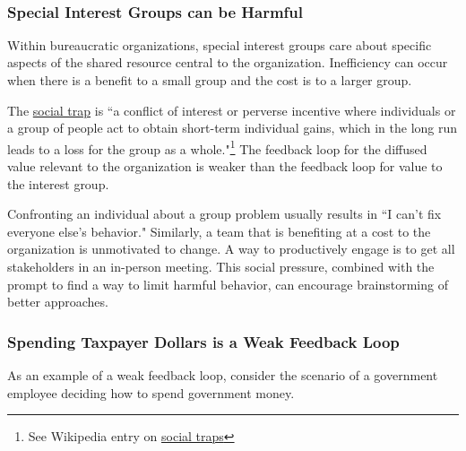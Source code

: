 
\ \\



\subsubsection*{Special Interest Groups can be Harmful}

Within bureaucratic organizations, special interest groups care about specific aspects of the shared resource central to the organization. 
Inefficiency can occur when there is a benefit to a small group and the cost is to a larger group.

The \href{https://en.wikipedia.org/wiki/Social_trap}{social trap}
\iftoggle{WPinmargin}{\marginpar{$>$Wikipedia: social trap}}{ }%
is ``a conflict of interest or perverse incentive where individuals or a group of people act to obtain short-term individual gains, which in the long run leads to a loss for the group as a whole."\footnote{See Wikipedia entry on \href{https://en.wikipedia.org/wiki/Social_trap}{social traps}}
The feedback loop for the diffused value relevant to the organization is weaker than the feedback loop for value to the interest group. 

Confronting an individual about a group problem usually results in ``I can't fix everyone else's behavior." Similarly, a team that is benefiting at a cost to the organization is unmotivated to change. A way to productively engage is to get all stakeholders in an in-person meeting. 
%
%
This social pressure, combined with the prompt to find a way to limit harmful behavior, can encourage brainstorming of better approaches. 

\subsubsection*{Spending Taxpayer Dollars is a Weak Feedback Loop}

As an example of a weak feedback loop, consider the scenario of a government employee deciding how to spend government money.


